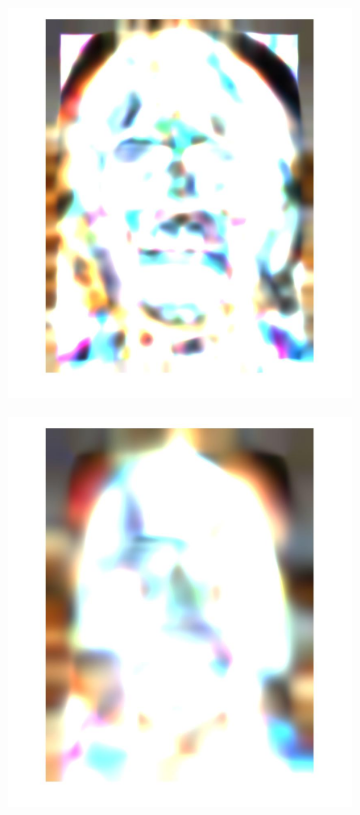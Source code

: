 \documentclass[a4paper]{iacas}
\begin{document}
\begin{figure}[!htbp]
\begin{subfigure}[b]{0.15\textwidth}
		\caption{}
		\label{fig:202}
	\end{subfigure}
	\begin{subfigure}[b]{0.15\textwidth}
		\includegraphics[width=\textwidth]{203.jpg}
		\caption{}
		\label{fig:203}
	\end{subfigure}
	\begin{subfigure}[b]{0.15\textwidth}
		\includegraphics[width=\textwidth]{204.jpg}

\end{subfigure}
\end{figure}
\end{document}
